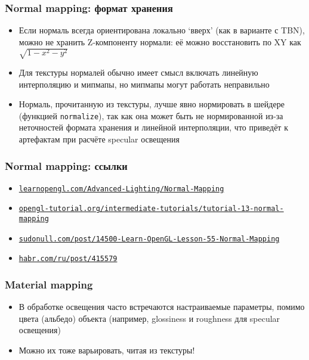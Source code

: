 \documentclass{beamer}
\begin{document}
\begin{frame}[fragile]
\frametitle{Normal mapping: формат хранения}
\fontsize{10pt}{10pt}
\begin{itemize}
\item Если нормаль всегда ориентирована локально `вверх' (как в варианте с TBN), можно не хранить Z-компоненту нормали: её можно восстановить по XY как \begin{math}\sqrt{1-x^2-y^2}\end{math}
\pause
\item Для текстуры нормалей обычно имеет смысл включать линейную интерполяцию и мипмапы, но мипмапы могут работать неправильно
\pause
\item Нормаль, прочитанную из текстуры, лучше явно нормировать в шейдере (функцией \verb|normalize|), так как она может быть не нормированной из-за неточностей формата хранения и линейной интерполяции, что приведёт к артефактам при расчёте specular освещения
\end{itemize}
\end{frame}

\begin{frame}[fragile]
\frametitle{Normal mapping: ссылки}
\begin{itemize}
\item \href{https://learnopengl.com/Advanced-Lighting/Normal-Mapping}{\nolinkurl{learnopengl.com/Advanced-Lighting/Normal-Mapping}}
\item \href{http://www.opengl-tutorial.org/intermediate-tutorials/tutorial-13-normal-mapping}{\nolinkurl{opengl-tutorial.org/intermediate-tutorials/tutorial-13-normal-mapping}}
\item \href{https://sudonull.com/post/14500-Learn-OpenGL-Lesson-55-Normal-Mapping}{\nolinkurl{sudonull.com/post/14500-Learn-OpenGL-Lesson-55-Normal-Mapping}}
\item \href{https://habr.com/ru/post/415579}{\nolinkurl{habr.com/ru/post/415579}}
\end{itemize}
\end{frame}

\begin{frame}[fragile]
\frametitle{Material mapping}
\begin{itemize}
\item В обработке освещения часто встречаются настраиваемые параметры, помимо цвета (альбедо) объекта (например, glossiness и roughness для specular освещения)
\pause
\item Можно их тоже варьировать, читая из текстуры!
\end{itemize}
\end{frame}
\end{document}
